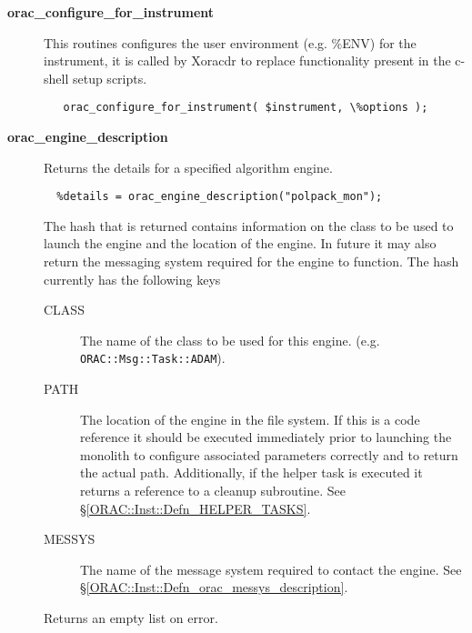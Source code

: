 \begin{description}
\item[{\textbf{orac\_configure\_for\_instrument}}] \mbox{}

This routines configures the user environment (e.g. \%ENV) for the instrument,
it is called by Xoracdr to replace functionality present in the c-shell setup scripts.

\begin{verbatim}
   orac_configure_for_instrument( $instrument, \%options );
\end{verbatim}

\item[{\textbf{orac\_engine\_description}}] \mbox{}

Returns the details for a specified algorithm engine.

\begin{verbatim}
  %details = orac_engine_description("polpack_mon");
\end{verbatim}


The hash that is returned contains information on the
class to be used to launch the engine and the location
of the engine. In future it may also return the messaging
system required for the engine to function. The hash currently
has the following keys

\begin{description}

\item[{CLASS}] \mbox{}

The name of the class to be used for this engine.
(e.g. \texttt{ORAC::Msg::Task::ADAM}).


\item[{PATH}] \mbox{}

The location of the engine in the file system. If this
is a code reference it should be executed immediately
prior to launching the monolith to configure associated
parameters correctly and to return the actual path.
Additionally, if the helper task is executed it returns
a reference to a cleanup subroutine. See \S\ref{ORAC::Inst::Defn_HELPER_TASKS}.


\item[{MESSYS}] \mbox{}

The name of the message system required to contact the engine.
See \S\ref{ORAC::Inst::Defn_orac_messys_description}.

\end{description}


Returns an empty list on error.




\end{description}
